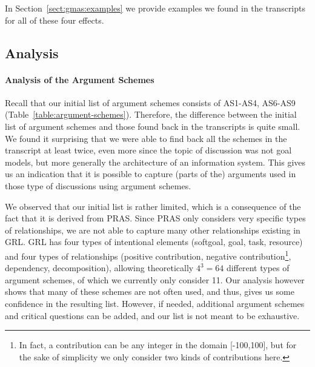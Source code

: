 In Section~\ref{sect:gmas:examples} we provide examples we found in the transcripts for all of these four effects.

\subsection{Analysis}
\label{sect:gmas:transcripts:analysis}

\paragraph{Analysis of the Argument Schemes}
Recall that our initial list of argument schemes consists of AS1-AS4, AS6-AS9 (Table~\ref{table:argument-schemes}). Therefore, the difference between the initial list of argument schemes and those found back in the transcripts is quite small. We found it surprising that we were able to find back all the schemes in the transcript at least twice, even more since the topic of discussion was not goal models, but more generally the architecture of an information system. This gives us an indication that it is possible to capture (parts of the) arguments used in those type of discussions using argument schemes.

We observed that our initial list is rather limited, which is a consequence of the fact that it is derived from PRAS. Since PRAS only considers very specific types of relationships, we are not able to capture many other relationships existing in GRL. GRL has four types of intentional elements (softgoal, goal, task, resource) and four types of relationships (positive contribution, negative contribution\footnote{In fact, a contribution can be any integer in the domain [-100,100], but for the sake of simplicity we only consider two kinds of contributions here.}, dependency, decomposition), allowing theoretically $4^3=64$ different types of argument schemes, of which we currently only consider 11. Our analysis however shows that many of these schemes are not often used, and thus, gives us some confidence in the resulting list. However, if needed, additional argument schemes and critical questions can be added, and our list is not meant to be exhaustive.

